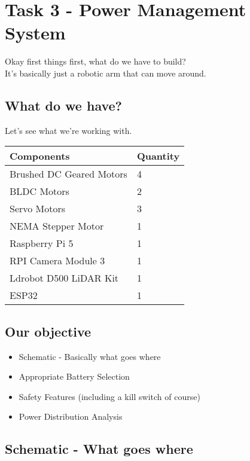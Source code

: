 \documentclass[12pt]{article}
\title{}
\author{EE24BTECH11002 Agamjot Singh\\IIT Hyderabad}
\date{\today}
\begin{document}

\section*{Task 3 - Power Management System}
Okay first things first, what do we have to build?\\
It's basically just a robotic arm that can move around.

\subsection*{What do we have?}
Let's see what we're working with.

\begin{table}[h]
\centering
\begin{tabular}{ll}
\toprule
\textbf{Components} & \textbf{Quantity} \\
\midrule
Brushed DC Geared Motors & 4 \\
BLDC Motors & 2 \\
Servo Motors & 3 \\
NEMA Stepper Motor & 1 \\
Raspberry Pi 5 & 1 \\
RPI Camera Module 3 & 1 \\
Ldrobot D500 LiDAR Kit & 1 \\
ESP32 & 1 \\
\bottomrule
\end{tabular}
\end{table}

\subsection*{Our objective}
\begin{itemize}
\item Schematic - Basically what goes where
\item Appropriate Battery Selection
\item Safety Features (including a kill switch of course)
\item Power Distribution Analysis 
\end{itemize}

\newpage

\subsection*{Schematic - What goes where}
\end{document}

